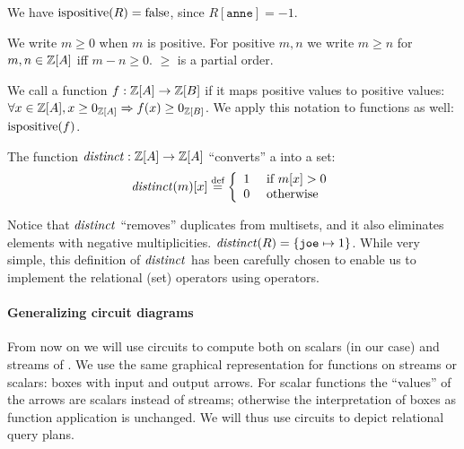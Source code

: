 \ifzsetexamples
We have $\mbox{ispositive}(R) = \mbox{false}$, since $R[\texttt{anne}] = -1$.
\fi

We write $m \geq 0$ when $m$ is
positive.  For positive $m, n$ we write $m \geq n$ for $m, n
\in \mathbb{Z}[A]$ iff $m - n \geq 0$.  $\geq$ is a partial order.

We call a function $f : \mathbb{Z}[A] \rightarrow \mathbb{Z}[B]$  if it maps
positive values to positive values:
$\forall x \in \mathbb{Z}[A], x \geq 0_{\mathbb{Z}[A]} \Rightarrow f(x) \geq 0_{\mathbb{Z}[B]}$.
We apply this notation to functions as well: $\mbox{ispositive}(f)$.

\begin{definition}[distinct]
The function $\mathit{distinct}: \mathbb{Z}[A] \rightarrow \mathbb{Z}[A]$
``converts'' a \zr into a set:
$$\mathit{distinct}(m)[x] \stackrel{\textrm{\scriptsize def}}{=} \left\{
\begin{array}{ll}
  1 & \mbox{ if } m[x] > 0 \\
  0 & \mbox{ otherwise}
\end{array}
\right.
$$
\end{definition}

Notice that $\mathit{distinct}$ ``removes'' duplicates from multisets, and it also eliminates
elements with negative multiplicities.
\ifzsetexamples
$\mathit{distinct}(R) = \{ \texttt{joe} \mapsto 1 \}$.
\fi
While very simple, this definition of $\mathit{distinct}$ has been carefully
chosen to enable us to implement the relational (set) operators
using \zrs operators.

%
%
\paragraph{Generalizing circuit diagrams}

From now on we will use circuits to compute both on scalars (\zrs in our case) and streams of \zrs.
We use the same graphical representation for functions on streams or scalars:
boxes with input and output arrows.  For scalar functions the ``values''
of the arrows are scalars instead of streams; otherwise
the interpretation of boxes as function application is unchanged.  We will
thus use circuits to depict relational query plans.

